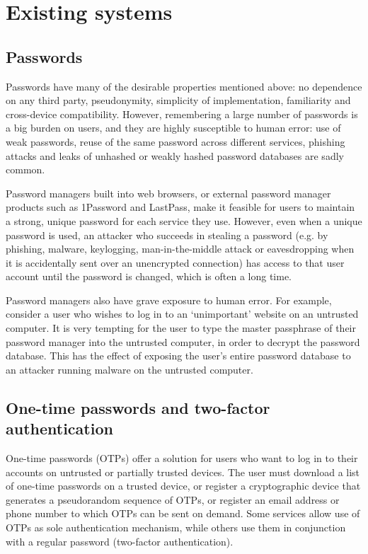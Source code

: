 \section{Existing systems}
\subsection{Passwords}

Passwords have many of the desirable properties mentioned above: no dependence on any third party,
pseudonymity, simplicity of implementation, familiarity and cross-device compatibility. However,
remembering a large number of passwords is a big burden on users, and they are highly susceptible to
human error: use of weak passwords, reuse of the same password across different services, phishing
attacks and leaks of unhashed or weakly hashed password databases are sadly common.

Password managers built into web browsers, or external password manager products such as 1Password
and LastPass, make it feasible for users to maintain a strong, unique password for each service they
use. However, even when a unique password is used, an attacker who succeeds in stealing a password
(e.g. by phishing, malware, keylogging, man-in-the-middle attack or eavesdropping when it is
accidentally sent over an unencrypted connection) has access to that user account until the password
is changed, which is often a long time.

Password managers also have grave exposure to human error. For example, consider a user who wishes
to log in to an `unimportant' website on an untrusted computer. It is very tempting for the user to
type the master passphrase of their password manager into the untrusted computer, in order to
decrypt the password database. This has the effect of exposing the user's entire password database
to an attacker running malware on the untrusted computer.

\subsection{One-time passwords and two-factor authentication}

One-time passwords (OTPs) offer a solution for users who want to log in to their accounts on
untrusted or partially trusted devices. The user must download a list of one-time passwords on a
trusted device, or register a cryptographic device that generates a pseudorandom sequence of OTPs,
or register an email address or phone number to which OTPs can be sent on demand. Some services
allow use of OTPs as sole authentication mechanism, while others use them in conjunction with a
regular password (two-factor authentication).

